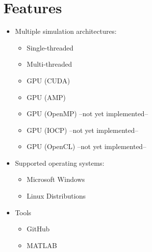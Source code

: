 \mdseries 
\section{Features}
\begin{itemize}
	\item Multiple simulation architectures:
	\begin{itemize}
		\item	Single-threaded
		\item Multi-threaded
		\item GPU (CUDA)
		\item GPU (AMP)
		\item GPU (OpenMP) --not yet implemented--
		\item GPU (IOCP) --not yet implemented--
		\item GPU (OpenCL) --not yet implemented--
	\end{itemize}
	\item Supported operating systems:
	\begin{itemize}
		\item Microsoft Windows
		\item Linux Distributions
	\end{itemize}
	\item Tools
	\begin{itemize}
		\item GitHub
		\item MATLAB
	\end{itemize}
\end{itemize}
\pagebreak
